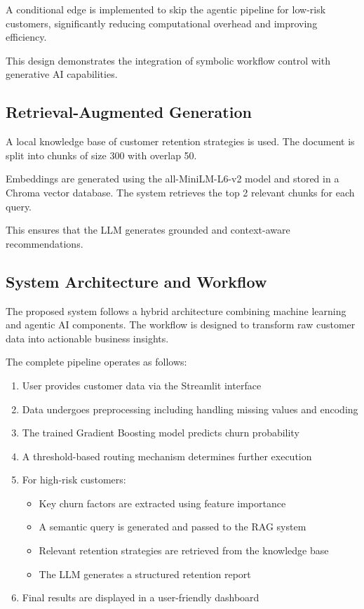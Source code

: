 \documentclass[conference]{IEEEtran}
\begin{document}
A conditional edge is implemented to skip the agentic pipeline for low-risk customers, significantly reducing computational overhead and improving efficiency.

This design demonstrates the integration of symbolic workflow control with generative AI capabilities.

\subsection{Retrieval-Augmented Generation}

A local knowledge base of customer retention strategies is used. The document is split into chunks of size 300 with overlap 50.

Embeddings are generated using the all-MiniLM-L6-v2 model and stored in a Chroma vector database. The system retrieves the top 2 relevant chunks for each query.

This ensures that the LLM generates grounded and context-aware recommendations.
\subsection{System Architecture and Workflow}

The proposed system follows a hybrid architecture combining machine learning and agentic AI components. The workflow is designed to transform raw customer data into actionable business insights.

The complete pipeline operates as follows:

\begin{enumerate}
\item User provides customer data via the Streamlit interface
\item Data undergoes preprocessing including handling missing values and encoding
\item The trained Gradient Boosting model predicts churn probability
\item A threshold-based routing mechanism determines further execution
\item For high-risk customers:
\begin{itemize}
\item Key churn factors are extracted using feature importance
\item A semantic query is generated and passed to the RAG system
\item Relevant retention strategies are retrieved from the knowledge base
\item The LLM generates a structured retention report
\end{itemize}
\item Final results are displayed in a user-friendly dashboard
\end{enumerate}
\end{document}
